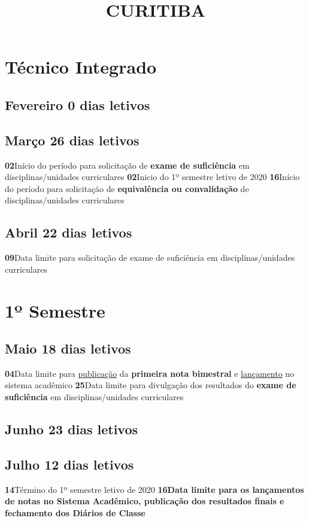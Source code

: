 \documentclass[thesis]{hmcposter}
\author{ }
\title{CURITIBA}
\begin{document}
\begin{poster}
\normalsize\section{\color{hmcorange}Técnico Integrado}\subsection{Fevereiro \hfill 0 dias letivos} \null \newline \subsection{Março \hfill 26 dias letivos}\textbf{02}\qquad Início do período para solicitação de \textbf{exame de suficiência} em disciplinas/unidades curriculares \newline\textbf{02}\qquad Inicio do 1º semestre letivo de 2020 \newline\textbf{16}\qquad Início do período para solicitação de \textbf{equivalência ou convalidação} de disciplinas/unidades curriculares \subsection{Abril \hfill 22 dias letivos}\textbf{09}\qquad Data limite para solicitação de exame de suficiência em disciplinas/unidades curriculares \vfill\null
\columnbreak
\section{\hfill \color{hmcorange}1º Semestre}
\subsection{Maio \hfill 18 dias letivos}\textbf{04}\qquad Data limite para \underline{publicação} da \textbf{primeira nota bimestral} e \underline{lançamento} no sistema acadêmico \newline\textbf{25}\qquad Data limite para divulgação dos resultados do \textbf{exame de suficiência} em disciplinas/unidades curriculares \subsection{Junho \hfill 23 dias letivos} \null \newline \subsection{Julho \hfill 12 dias letivos}\textbf{14}\qquad Término do 1º semestre letivo de 2020
 \newline\textbf{16}\qquad \textbf{Data limite para os lançamentos de notas no Sistema Acadêmico, publicação dos resultados finais e fechamento dos Diários de Classe} \newpage

\end{poster}
\end{document}
